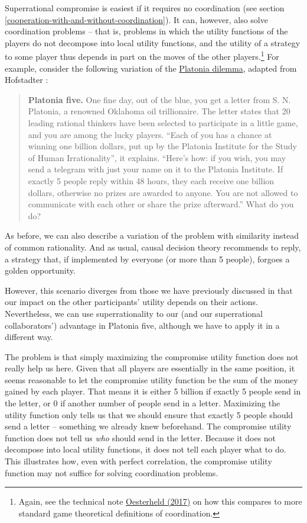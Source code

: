 Superrational compromise is easiest if it requires no coordination (see
section
\ref{cooperation-with-and-without-coordination}). It can, however, also solve
coordination problems -- that is, problems in which the utility
functions of the players do not decompose into local utility functions,
and the utility of a strategy to some player thus depends in part on the
moves of the other players.\footnote{Again, see the technical note
  \href{https://casparoesterheld.files.wordpress.com/2017/03/technicalnoteoncgs.pdf}{Oesterheld
  (2017)} on how this compares to more standard game theoretical
  definitions of coordination.} For example, consider the following
variation of the
\href{https://en.wikipedia.org/wiki/Platonia_dilemma}{Platonia
dilemma}, adapted from Hofstadter \citeyear{Hofstadter1983-az}:

\begin{quote}
\textbf{Platonia five.} One fine day, out of the blue, you get a letter
from S. N. Platonia, a renowned Oklahoma oil trillionaire. The letter
states that 20 leading rational thinkers have been selected to
participate in a little game, and you are among the lucky players.
``Each of you has a chance at winning one billion dollars, put up by the
Platonia Institute for the Study of Human Irrationality'', it explains.
``Here's how: if you wish, you may send a telegram with just your name
on it to the Platonia Institute. If exactly 5 people reply within 48
hours, they each receive one billion dollars, otherwise no prizes are
awarded to anyone. You are not allowed to communicate with each other or
share the prize afterward.'' What do you do?
\end{quote}

As before, we can also describe a variation of the problem with
similarity instead of common rationality. And as usual, causal decision
theory recommends to reply, a strategy that, if implemented by everyone
(or more than 5 people), forgoes a golden opportunity.

However, this scenario diverges from those we have previously discussed
in that our impact on the other participants' utility depends on their
actions. Nevertheless, we can use superrationality to our (and our
superrational collaborators') advantage in Platonia five, although we
have to apply it in a different way.

The problem is that simply maximizing the compromise utility function
does not really help us here. Given that all players are essentially in
the same position, it seems reasonable to let the compromise utility
function be the sum of the money gained by each player. That means it is
either 5 billion if exactly 5 people send in the letter, or 0 if another
number of people send in a letter. Maximizing the utility function only
tells us that we should ensure that exactly 5 people should send a
letter -- something we already knew beforehand. The compromise utility
function does not tell us \emph{who} should send in the letter. Because
it does not decompose into local utility functions, it does not tell
each player what to do. This illustrates how, even with perfect
correlation, the compromise utility function may not suffice for solving
coordination problems.

